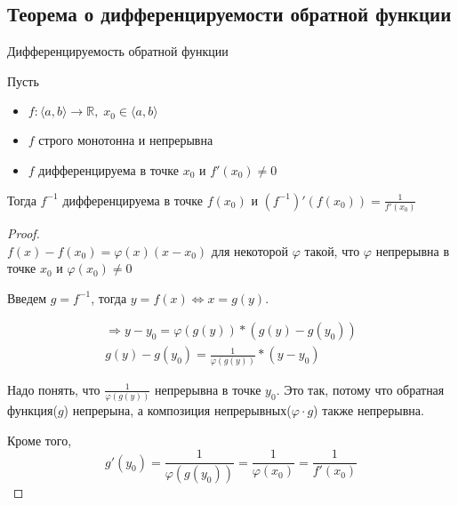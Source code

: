 \subsection{Теорема о дифференцируемости обратной функции \href{https://youtu.be/OXDjegAsmSU?t=3328}{\Walley}}
\begin{theorem-non}
    Дифференцируемость обратной функции

    Пусть
    \begin{itemize}
        \item $f: \langle a, b \rangle \to \mathbb{R}, \; x_0 \in \langle a, b \rangle$
        \item $f$ строго монотонна и непрерывна
        \item $f$ дифференцируема в точке $x_0$ и $f'(x_0) \neq 0$
    \end{itemize}

    Тогда $f^{-1}$ дифференцируема в точке $f(x_0)$ и $(f^{-1})'(f(x_0)) = \frac{1}{f'(x_0)}$
\end{theorem-non}
\begin{proof} \quad \\
    $f(x) - f(x_0) = \varphi(x)(x - x_0)$ для некоторой $\varphi$ такой, что $\varphi$ непрерывна в точке $x_0$ и $\varphi(x_0) \neq 0$

    Введем $g = f^{-1}$, тогда $y = f(x) \Leftrightarrow x = g(y)$.

    \begin{gather*}
        \Rightarrow y - y_0 = \varphi(g(y)) * (g(y) - g(y_0)) \\
        g(y) - g(y_0) = \frac{1}{\varphi(g(y))} * (y - y_0)
    \end{gather*}

    Надо понять, что $\frac{1}{\varphi(g(y))}$ непрерывна в точке $y_0$. Это так, потому что обратная функция($g$) непрерына, а композиция непрерывных($\varphi \cdot g$) также непрерывна.

    Кроме того,
    \[ g'(y_0) = \frac{1}{\varphi(g(y_0))} = \frac{1}{\varphi(x_0)} = \frac{1}{f'(x_0)} \]
\end{proof}